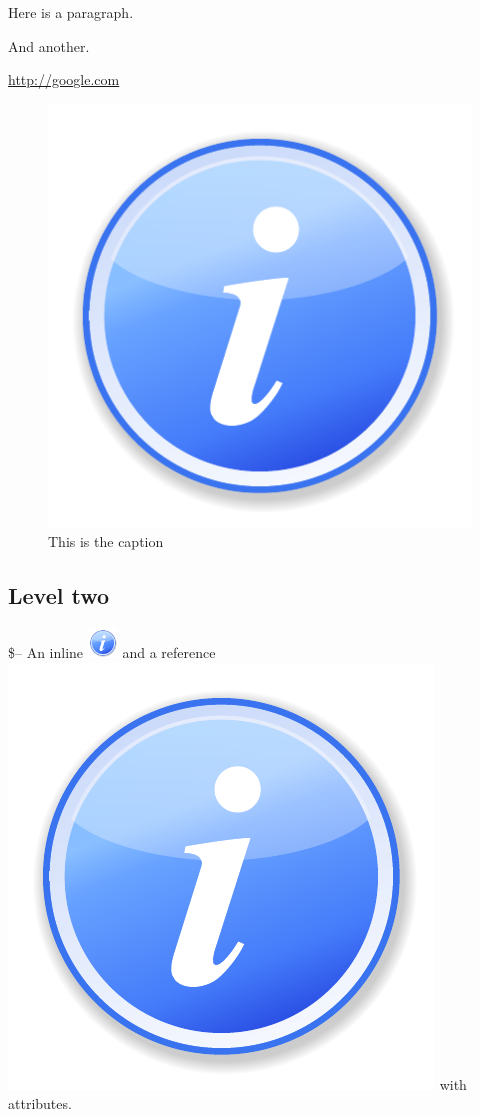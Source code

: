 \leavevmode\hypertarget{special}{}%
Here is a paragraph.

And another.

\url{http://google.com}

\begin{figure}
\centering
\includegraphics{images/information.pdf}
\caption{This is the caption}
\end{figure}

\hypertarget{level-two}{%
\subsection{Level two}\label{level-two}}

\$-- An inline
\includegraphics[width=0.3125in,height=0.3125in]{images/information.pdf}
and a reference \includegraphics{images/information.pdf} with
attributes.\\

